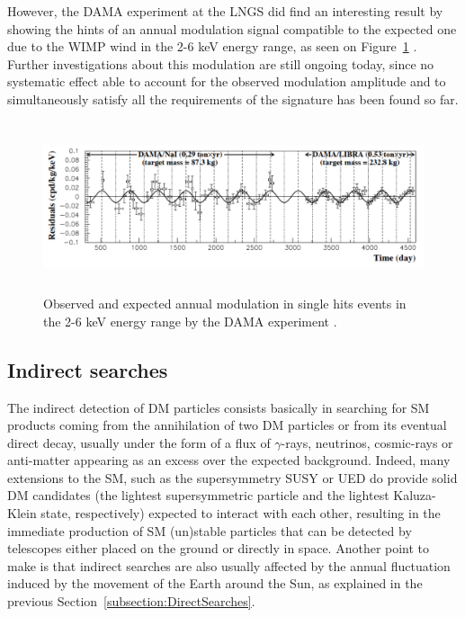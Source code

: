 \documentclass[a4paper, 10pt, openright]{report}
\begin{document}
However, the DAMA experiment at the \ac{LNGS} did find an interesting result by showing the hints of an annual modulation signal compatible to the expected one due to the \ac{WIMP} wind in the 2-6 keV energy range, as seen on Figure~\ref{fig:DAMA} \cite{DAMA}. Further investigations about this modulation are still ongoing today, since no systematic effect able to account for the observed modulation amplitude and to simultaneously satisfy all the requirements of the signature has been found so far.

\begin{figure}[htbp]
\begin{center}
\includegraphics[width=14cm, height=5cm]{figs/DAMA.png}
\caption{Observed and expected annual modulation in single hits events in the 2-6 keV energy range by the DAMA experiment \cite{DAMA}.}
\label{fig:DAMA}
\end{center}
\end{figure}

\subsection{Indirect searches}

The indirect detection of \ac{DM} particles consists basically in searching for \ac{SM} products coming from the annihilation of two \ac{DM} particles or from its eventual direct decay, usually under the form of a flux of $\gamma$-rays, neutrinos, cosmic-rays or anti-matter appearing as an excess over the expected background. Indeed, many extensions to the \ac{SM}, such as the supersymmetry SUSY or \ac{UED} do provide solid \ac{DM} candidates (the lightest supersymmetric particle and the lightest Kaluza-Klein state, respectively) expected to interact with each other, resulting in the immediate production of \ac{SM} (un)stable particles that can be detected by telescopes either placed on the ground or directly in space. Another point to make is that indirect searches are also usually affected by the annual fluctuation induced by the movement of the Earth around the Sun, as explained in the previous Section~\ref{subsection:DirectSearches}.
\end{document}
